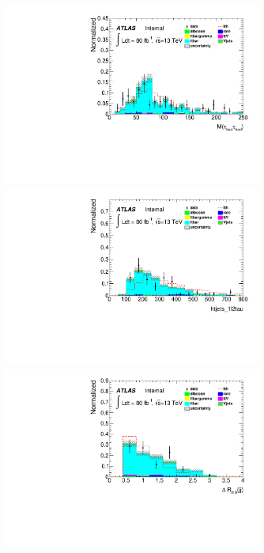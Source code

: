 \begin{figure}[htp]
\begin{minipage}[t]{0.33\linewidth}
\end{minipage}\\
\begin{minipage}[t]{0.33\linewidth}
\centering
\includegraphics[width=0.75\textwidth,angle=-90]{fig/OneL2tauSSnoBDT_norm/mtautau_1l2tau_F.pdf}
\end{minipage}
\begin{minipage}[t]{0.33\linewidth}
\centering
\includegraphics[width=0.75\textwidth,angle=-90]{fig/OneL2tauSSnoBDT_norm/htjets_1l2tau_F.pdf}
\end{minipage}
\begin{minipage}[t]{0.33\linewidth}
\centering
\includegraphics[width=0.75\textwidth,angle=-90]{fig/OneL2tauSSnoBDT_norm/jjdrmin_1l2tau_F.pdf}

\end{minipage}
\end{figure}
